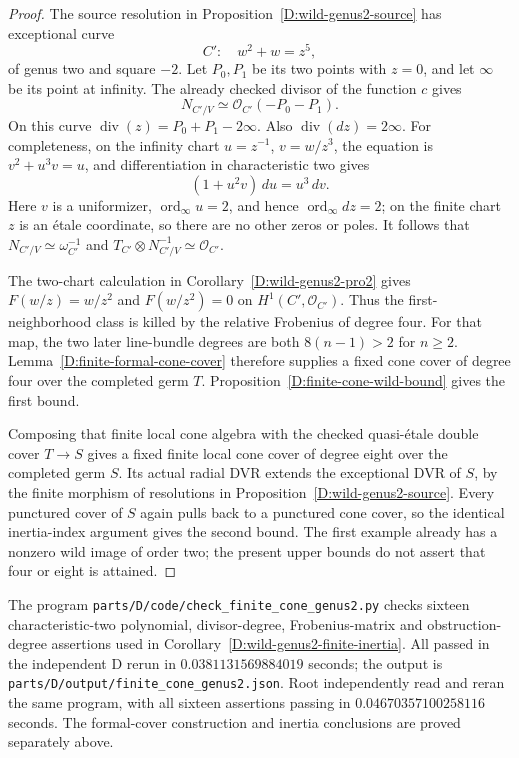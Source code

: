 \begin{proof}
The source resolution in
Proposition~\ref{D:wild-genus2-source} has exceptional curve
\[
                   C':\quad w^2+w=z^5,
\]
of genus two and square $-2$.  Let $P_0,P_1$ be its two
points with $z=0$, and let $\infty$ be its point at infinity.
The already checked divisor of the function $c$ gives
\[
                    N_{C'/V}\simeq\mathcal O_{C'}(-P_0-P_1).
\]
On this curve
$\operatorname{div}(z)=P_0+P_1-2\infty$.
Also $\operatorname{div}(dz)=2\infty$.  For completeness,
on the infinity chart $u=z^{-1}$, $v=w/z^3$, the equation
is $v^2+u^3v=u$, and differentiation in characteristic two
gives
\[
                  (1+u^2v)\,du=u^3\,dv.
\]
Here $v$ is a uniformizer, $\operatorname{ord}_\infty u=2$,
and hence $\operatorname{ord}_\infty dz=2$; on the finite
chart $z$ is an \'etale coordinate, so there are no other
zeros or poles.  It follows that
$N_{C'/V}\simeq\omega_{C'}^{-1}$ and
$T_{C'}\otimes N_{C'/V}^{-1}\simeq\mathcal O_{C'}$.

The two-chart calculation in
Corollary~\ref{D:wild-genus2-pro2} gives
$F(w/z)=w/z^2$ and $F(w/z^2)=0$ on
$H^1(C',\mathcal O_{C'})$.  Thus the first-neighborhood
class is killed by the relative Frobenius of degree four.
For that map, the two later line-bundle degrees are both
$8(n-1)>2$ for $n\geq2$.  Lemma~\ref{D:finite-formal-cone-cover}
therefore supplies a fixed cone cover of degree four
over the completed germ $T$.
Proposition~\ref{D:finite-cone-wild-bound} gives the first
bound.

Composing that finite local cone algebra with the checked
quasi-\'etale double cover $T\to S$ gives a fixed finite
local cone cover of degree eight over the completed germ
$S$.  Its actual radial DVR extends the exceptional
DVR of $S$, by the finite morphism of resolutions in
Proposition~\ref{D:wild-genus2-source}.  Every punctured
cover of $S$ again pulls back to a punctured cone cover,
so the identical inertia-index argument gives the
second bound.  The first example already has a nonzero
wild image of order two; the present upper bounds do
not assert that four or eight is attained.
\end{proof}

\begin{remark}
The program \nolinkurl{parts/D/code/check_finite_cone_genus2.py}
checks sixteen characteristic-two polynomial, divisor-degree,
Frobenius-matrix and obstruction-degree assertions used in
Corollary~\ref{D:wild-genus2-finite-inertia}.
All passed in the independent D rerun in
$0.0381131569884019$ seconds; the output is
\nolinkurl{parts/D/output/finite_cone_genus2.json}.
Root independently read and reran the same program, with all
sixteen assertions passing in $0.04670357100258116$ seconds.
The formal-cover construction and inertia conclusions are
proved separately above.
\end{remark}

